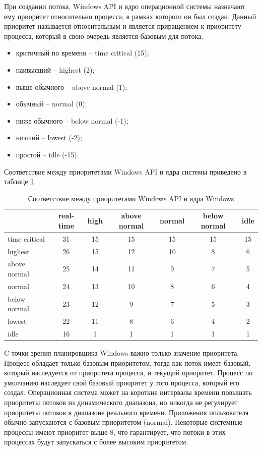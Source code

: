При создании потока, Windows API и ядро операционной системы назначают ему приоритет относительно процесса, в рамках которого он был создан. Данный приоритет называется относительным и является приращением к приоритету процесса, который в свою очередь является базовым для потока.

\begin{itemize}
	\item критичный по времени -- time critical (15);
	\item наивысший -- highest (2);
	\item выше обычного -- above normal (1);
	\item обычный -- normal (0);
	\item ниже обычного -- below normal (-1);
	\item низший -- lowest (-2);
	\item простой -- idle (-15).
\end{itemize}

Соответствие между приоритетами Windows API и ядра системы приведено в таблице \ref{table:2}.

\begin{table}
	\begin{center}
		\caption{Соответствие между приоритетами Windows API и ядра Windows}
		\begin{tabular}{|l|c|c|c|c|c|c|}
			\hline
			~ & \textbf{real-time} & \textbf{high} & \textbf{above normal} & \textbf{normal} & \textbf{below normal} & \textbf{idle} \\
			\hline
			time critical & 31 & 15 & 15 & 15 & 15 & 15 \\
			\hline
			highest & 26 & 15 & 12 & 10 & 8 & 6 \\
			\hline
			above normal & 25 & 14 & 11 & 9 & 7 & 5 \\
			\hline
			normal & 24 & 13 & 10 & 8 & 6 & 4 \\
			\hline
			below normal & 23 & 12 & 9 & 7 & 5 & 3 \\
			\hline
			lowest & 22 & 11 & 8 & 6 & 4 & 2 \\
			\hline
			idle & 16 & 1 & 1 & 1 & 1 & 1 \\
			\hline
		\end{tabular}
		\label{table:2}
	\end{center}
\end{table}

C точки зрения планировщика Windows важно только значение приоритета. Процесс обладает только базовым приоритетом, тогда как поток имеет базовый, который наследуется от приоритета процесса, и текущий приоритет. Процесс по умолчанию наследует свой базовый приоритет у того процесса, который его создал. Операционная система может на короткие интервалы времени повышать приоритеты потоков из динамического диапазона, но никогда не регулирует приоритеты потоков в диапазоне реального времени. Приложения пользователя обычно запускаются с базовым приоритетом (normal). Некоторые системные процессы имеют приоритет выше 8, что гарантирует, что потоки в этих процессах будут запускаться с более высоким приоритетом.

